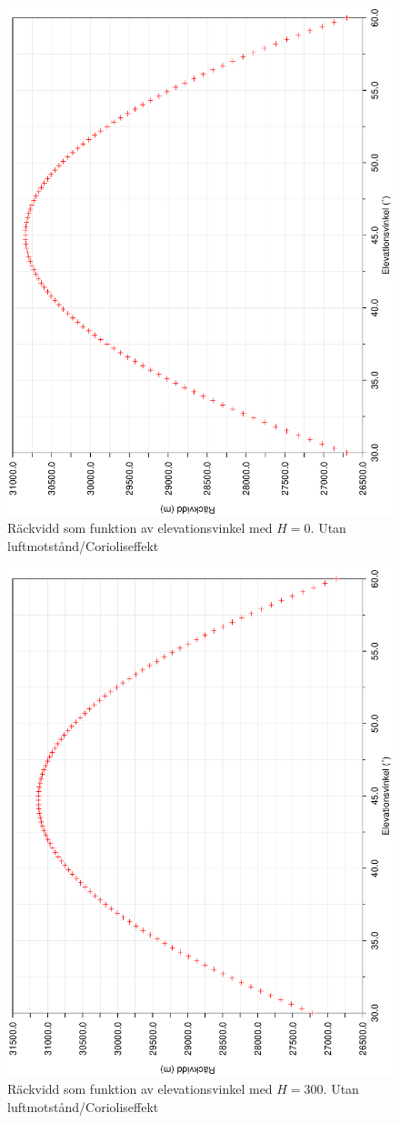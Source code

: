 \documentclass[a4paper]{article}
\begin{document}
\begin{figure}[h!]
	\centering
	\includegraphics[width=0.5\linewidth, angle=-90]{Data/ProjektilH0.eps}
	\caption{Räckvidd som funktion av elevationsvinkel med $H = 0$. Utan luftmotstånd/Corioliseffekt}
	\label{fig:projektilH0}
\end{figure}

\begin{figure}[h!]
	\centering
	\includegraphics[width=0.5\linewidth, angle=-90]{Data/ProjektilH300.eps}
	\caption{Räckvidd som funktion av elevationsvinkel med $H = 300$. Utan luftmotstånd/Corioliseffekt}
	\label{fig:projektilH300}
\end{figure}
\end{document}
